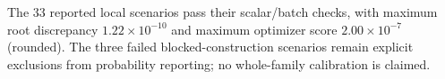 The 33 reported local scenarios pass their scalar/batch checks, with maximum root discrepancy $1.22\times10^{-10}$ and maximum optimizer score $2.00\times10^{-7}$ (rounded). The three failed blocked-construction scenarios remain explicit exclusions from probability reporting; no whole-family calibration is claimed.
